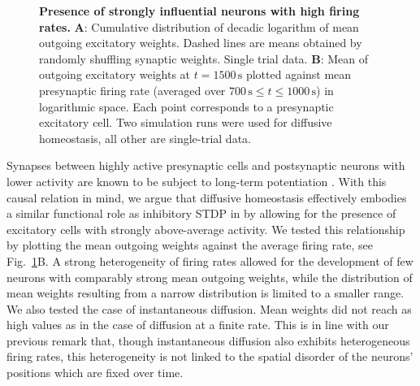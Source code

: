 \documentclass[10pt,letterpaper]{article}
\begin{document}
\begin{figure}
\caption{{\bf Presence of strongly influential neurons with high firing rates.} \textbf{A}: Cumulative distribution of decadic logarithm of mean outgoing excitatory weights. Dashed lines are means obtained by randomly shuffling synaptic weights. Single trial data. \textbf{B}: Mean of outgoing excitatory weights at $t=\mathrm{1500\,s}$ plotted against mean presynaptic firing rate (averaged over $\mathrm{700\,s \leq} t \mathrm{ \leq 1000\,s}$) in logarithmic space. Each point corresponds to a presynaptic excitatory cell. Two simulation runs were used for diffusive homeostasis, all other are single-trial data.}
\label{Outgoing_Weights_Comp}
\end{figure}

Synapses between highly active presynaptic cells and postsynaptic neurons with lower activity are known to be subject to long-term potentiation \cite{Sjoestroem_Syn_Plasticity_2001,Feldman_STDP_2012}. With this causal relation in mind, we argue that diffusive homeostasis effectively embodies a similar functional role as inhibitory STDP in \cite{Effenberger_2015} by allowing for the presence of excitatory cells with strongly above-average activity. We tested this relationship by plotting the mean outgoing weights against the average firing rate, see Fig.~\ref{Outgoing_Weights_Comp}B. A strong heterogeneity of firing rates allowed for the development of few neurons with comparably strong mean outgoing weights, while the distribution of mean weights resulting from a narrow distribution is limited to a smaller range. We also tested the case of instantaneous diffusion. Mean weights did not reach as high values as in the case of diffusion at a finite rate. This is in line with our previous remark that, though instantaneous diffusion also exhibits heterogeneous firing rates, this heterogeneity is not linked to the spatial disorder of the neurons' positions which are fixed over time.
\end{document}
